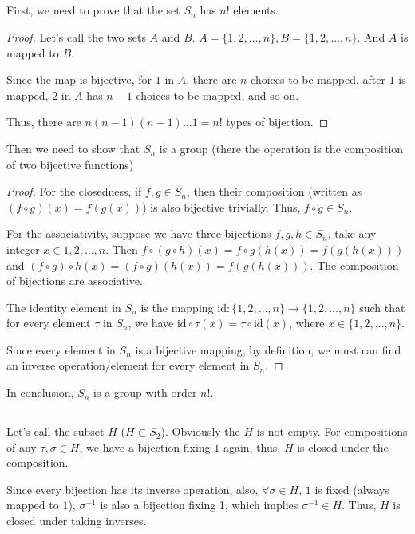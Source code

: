 \documentclass[12pt]{article}
\begin{document}
\subsection{} %
First, we need to prove that the set $S_n$ has $n!$ elements.
\begin{proof}
Let's call the two sets $A$ and $B$. $A=\{1,2,\dots,n\},B=\{1,2,\dots,n\}$. And $A$ is mapped to $B$.

Since the map is bijective, for $1$ in $A$, there are $n$ choices to be mapped, after $1$ is mapped, $2$ in $A$ has $n-1$ choices to be mapped, and so on.

Thus, there are $n(n-1)(n-1)\dots1=n!$ types of bijection.
\end{proof}
Then we need to show that $S_n$ is a group (there the operation is the composition of two bijective functions)
\begin{proof}
For the closedness, if $f,g\in S_n$, then their composition (written as $(f\circ g)(x)=f(g(x))$) is also bijective trivially. Thus, $f\circ g\in S_n$.

For the associativity, suppose we have three bijections $f,g,h\in S_n$, take any integer $x\in{1,2,\dots,n}$. Then $f\circ (g\circ h)(x)=f\circ g(h(x))=f(g(h(x)))$ and $(f\circ g)\circ h(x)=(f\circ g)(h(x))=f(g(h(x)))$. The composition of bijections are associative.

The identity element in $S_n$ is the mapping $\mathrm{id}:\{1,2,\dots,n\}\rightarrow\{1,2,\dots,n\}$ such that for every element $\tau$ in $S_n$, we have $\mathrm{id}\circ\tau(x)=\tau\circ\mathrm{id}(x)$, where $x\in\{1,2,\dots,n\}$.

Since every element in $S_n$ is a bijective mapping, by definition, we must can find an inverse operation/element for every element in $S_n$.
\end{proof}
In conclusion, $S_n$ is a group with order $n!$.
\subsection{} %
Let's call the subset $H$ ($H\subset S_2$). Obviously the $H$ is not empty. For compositions of any $\tau,\sigma\in H$, we have a bijection fixing $1$ again, thus, $H$ is closed under the composition.

Since every bijection has its inverse operation, also, $\forall \sigma\in H$, $1$ is fixed (always mapped to $1$), $\sigma^{-1}$ is also a bijection fixing 1, which implies $\sigma^{-1}\in H$. Thus, $H$ is closed under taking inverses.
\end{document}
